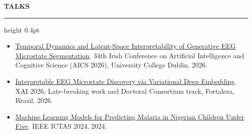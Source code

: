 \documentclass[11pt]{article}
\newcommand{\cvsection}[1]{%
  \par\vspace{5pt}%
  {\fontsize{11.5pt}{13pt}\selectfont\bfseries\MakeUppercase{#1}\par}%
  \nobreak\vspace{2pt}\hrule height 0.4pt\nobreak\vspace{2pt}%
}
\begin{document}
\cvsection{Talks}
\begin{itemize}
  \setlength{\itemsep}{3pt}
  \item \href{https://aics2026.com/}{Temporal Dynamics and Latent-Space Interpretability of Generative EEG Microstate Segmentation}.\newline
  34th Irish Conference on Artificial Intelligence and Cognitive Science (AICS 2026), University College Dublin, 2026.
  \item \href{https://arxiv.org/abs/2605.10947}{Interpretable EEG Microstate Discovery via Variational Deep Embedding}.\newline
  XAI 2026, Late-breaking work and Doctoral Consortium track, Fortaleza, Brazil, 2026.
  \item \href{https://doi.org/10.1109/ICTAS59620.2024.10507142}{Machine Learning Models for Predicting Malaria in Nigerian Children Under Five}.\newline
  IEEE ICTAS 2024, 2024.
\end{itemize}
\end{document}
